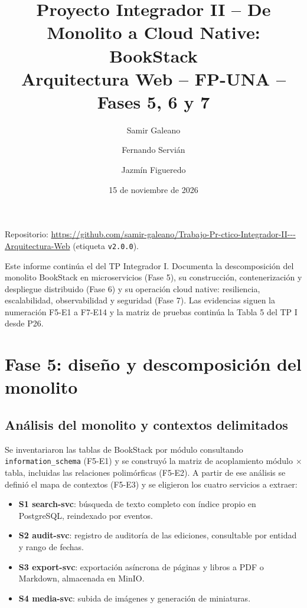 \documentclass[11pt,a4paper]{article}
\title{Proyecto Integrador II -- De Monolito a Cloud Native: BookStack\\[4pt]\large Arquitectura Web -- FP-UNA -- Fases 5, 6 y 7}
\author{Samir Galeano \and Fernando Servián \and Jazmín Figueredo}
\date{15 de noviembre de 2026}
\begin{document}
\maketitle
\noindent Repositorio: \url{https://github.com/samir-galeano/Trabajo-Pr-ctico-Integrador-II---Arquitectura-Web} (etiqueta \texttt{v2.0.0}).

Este informe continúa el del TP Integrador I. Documenta la descomposición del monolito BookStack en microservicios (Fase 5), su construcción, contenerización y despliegue distribuido (Fase 6) y su operación cloud native: resiliencia, escalabilidad, observabilidad y seguridad (Fase 7). Las evidencias siguen la numeración F5-E1 a F7-E14 y la matriz de pruebas continúa la Tabla 5 del TP I desde P26.

\tableofcontents
\newpage

\section{Fase 5: diseño y descomposición del monolito}
\subsection{Análisis del monolito y contextos delimitados}
Se inventariaron las tablas de BookStack por módulo consultando \texttt{information\_schema} (F5-E1) y se construyó la matriz de acoplamiento módulo $\times$ tabla, incluidas las relaciones polimórficas (F5-E2). A partir de ese análisis se definió el mapa de contextos (F5-E3) y se eligieron los cuatro servicios a extraer:
\begin{itemize}
  \item \textbf{S1 search-svc}: búsqueda de texto completo con índice propio en PostgreSQL, reindexado por eventos.
  \item \textbf{S2 audit-svc}: registro de auditoría de las ediciones, consultable por entidad y rango de fechas.
  \item \textbf{S3 export-svc}: exportación asíncrona de páginas y libros a PDF o Markdown, almacenada en MinIO.
  \item \textbf{S4 media-svc}: subida de imágenes y generación de miniaturas.
\end{itemize}
\end{document}
